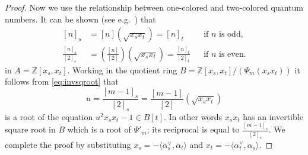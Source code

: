 \documentclass{amsart}
\theoremstyle{plain}
\theoremstyle{definition}
\theoremstyle{remark}
\numberwithin{equation}{section}
\newcommand{\ZZ}{\mathbb{Z}}
\begin{document}
\begin{proof}
Now we use the relationship between one-colored and two-colored quantum numbers.
It can be shown (see e.g.~\cite[(6)]{2colJW}) that
\begin{equation}
\begin{aligned}
[n]_{s}& =[n](\sqrt{x_{s} x_{t}})=[n]_{t} & & \text{if $n$ is odd,} \\
\frac{[n]_{s}}{[2]_{s}}& =\left(\frac{[n]}{[2]}\right)(\sqrt{x_{s} x_{t}})=\frac{[n]_{t}}{[2]_{t}} & & \text{if $n$ is even.}
\end{aligned} \label{eq:2colqnumfrom1col}
\end{equation}
in $A=\ZZ[x_s,x_t]$.
Working in the quotient ring $B=\ZZ[x_s,x_t]/(\Psi_{m}(x_s x_t))$ it follows from \eqref{eq:invsqroot} that
\begin{equation*}
u=\frac{[m-1]_s}{[2]_s}=\frac{[m-1]}{[2]}(\sqrt{x_s x_t})
\end{equation*}
is a root of the equation $u^2 x_s x_t - 1 \in B[t]$.
In other words $x_s x_t$ has an invertible square root in $B$ which is a root of $\Psi'_m$; its reciprocal is equal to $\frac{[m-1]_s}{[2]_s}$.
We complete the proof by substituting $x_s=-\langle \alpha_s^\vee, \alpha_t\rangle$ and $x_t=-\langle \alpha_t^\vee, \alpha_s\rangle$. 
%
%

\end{proof}
\end{document}
